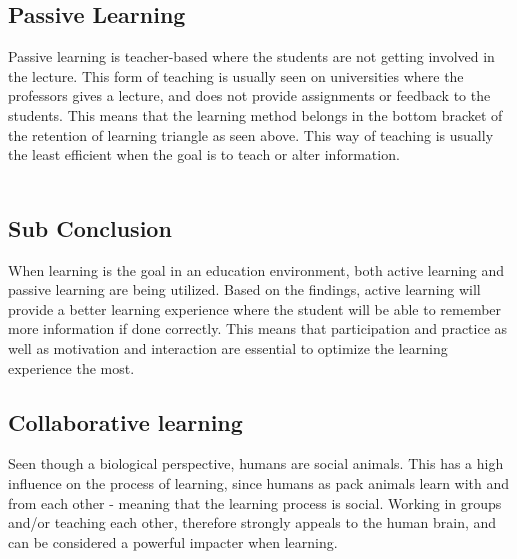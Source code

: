 \subsection*{Passive Learning}
Passive learning is teacher-based where the students are not getting involved in the lecture. This form of teaching is usually seen on universities where the professors gives a lecture, and does not provide assignments or feedback to the students. This means that the learning method belongs in the bottom bracket of the retention of learning triangle as seen above. This way of teaching is usually the least efficient when the goal is to teach or alter information\cite{learning}.\\
\\
\subsection*{Sub Conclusion}
When learning is the goal in an education environment, both active learning and passive learning are being utilized. Based on the findings, active learning will provide a better learning experience where the student will be able to remember more information if done correctly. This means that participation and practice as well as motivation and interaction are essential to optimize the learning experience the most.

\subsection{Collaborative learning}\label{collabLearning}

Seen though a biological perspective, humans are social animals\cite{laeringIPraksis}. This has a high influence on the process of learning, since humans as pack animals learn with and from each other - meaning that the learning process is social\cite{laeringIPraksis}. Working in groups and/or teaching each other, therefore strongly appeals to the human brain, and can be considered a powerful impacter when learning\cite{laeringIPraksis}.        

